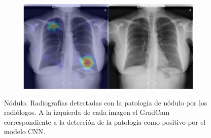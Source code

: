 \begin{figure}[b]
\begin{subfigure}{0.4\textwidth}
    \end{subfigure}
    \begin{subfigure}{0.4\textwidth}
        \centering
        \includegraphics[width=1.0\textwidth]{Chapters/5. Conclusiones/img/Nodule/1_1_00026319_000.png}
    \end{subfigure}

    \caption{Nódulo. Radiografías detectadas con la patología de nódulo por los
                    radiólogos. A la izquierda de cada imagen el GradCam correspondiente a la detección
                    de la patología como positivo por el modelo CNN.}
\end{figure}

